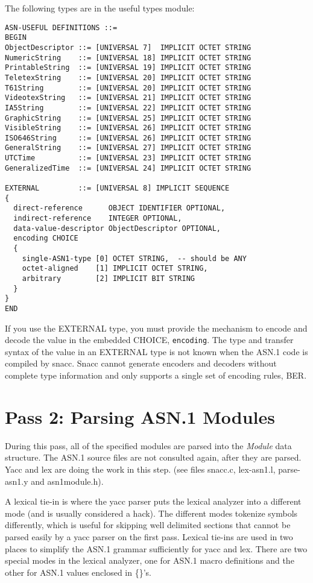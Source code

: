 The following types are in the useful types module:
\begin{small}
\begin{verbatim}
ASN-USEFUL DEFINITIONS ::=
BEGIN
ObjectDescriptor ::= [UNIVERSAL 7]  IMPLICIT OCTET STRING
NumericString    ::= [UNIVERSAL 18] IMPLICIT OCTET STRING
PrintableString  ::= [UNIVERSAL 19] IMPLICIT OCTET STRING
TeletexString    ::= [UNIVERSAL 20] IMPLICIT OCTET STRING
T61String        ::= [UNIVERSAL 20] IMPLICIT OCTET STRING
VideotexString   ::= [UNIVERSAL 21] IMPLICIT OCTET STRING
IA5String        ::= [UNIVERSAL 22] IMPLICIT OCTET STRING
GraphicString    ::= [UNIVERSAL 25] IMPLICIT OCTET STRING
VisibleString    ::= [UNIVERSAL 26] IMPLICIT OCTET STRING
ISO646String     ::= [UNIVERSAL 26] IMPLICIT OCTET STRING
GeneralString    ::= [UNIVERSAL 27] IMPLICIT OCTET STRING
UTCTime          ::= [UNIVERSAL 23] IMPLICIT OCTET STRING
GeneralizedTime  ::= [UNIVERSAL 24] IMPLICIT OCTET STRING

EXTERNAL         ::= [UNIVERSAL 8] IMPLICIT SEQUENCE
{
  direct-reference      OBJECT IDENTIFIER OPTIONAL,
  indirect-reference    INTEGER OPTIONAL,
  data-value-descriptor ObjectDescriptor OPTIONAL,
  encoding CHOICE
  {
    single-ASN1-type [0] OCTET STRING,  -- should be ANY
    octet-aligned    [1] IMPLICIT OCTET STRING,
    arbitrary        [2] IMPLICIT BIT STRING
  }
}
END
\end{verbatim}
\end{small}

If you use the EXTERNAL type, you must provide the mechanism to encode
and decode the value in the embedded CHOICE, \verb$encoding$.  The
type and transfer syntax of the value in an EXTERNAL type is not known
when the ASN.1 code is compiled by snacc.  Snacc cannot generate
encoders and decoders without complete type information and only
supports a single set of encoding rules, BER\@.

\section{\label{comp-pass2-section}Pass 2: Parsing ASN.1 Modules}
During this pass, all of the specified modules are parsed into the {\em
Module} data structure.  The ASN.1 source files are not consulted
again, after they are parsed.  {\ufn Yacc} and {\ufn lex} are doing the work in
this step. (see files {\ufn snacc.c}, {\ufn lex-asn1.l}, {\ufn parse-asn1.y}
and {\ufn asn1module.h}).

A lexical tie-in is where the yacc parser puts the lexical analyzer
into a different mode (and is usually considered a hack).  The
different modes tokenize symbols differently, which is useful for
skipping well delimited sections that cannot be parsed easily by a
{\ufn yacc} parser on the first pass.  Lexical tie-ins are used in two
places to simplify the ASN.1 grammar sufficiently for {\ufn yacc} and
{\ufn lex}.  There are two special modes in the lexical analyzer, one
for ASN.1 macro definitions and the other for ASN.1 values enclosed in
\{\}'s.

